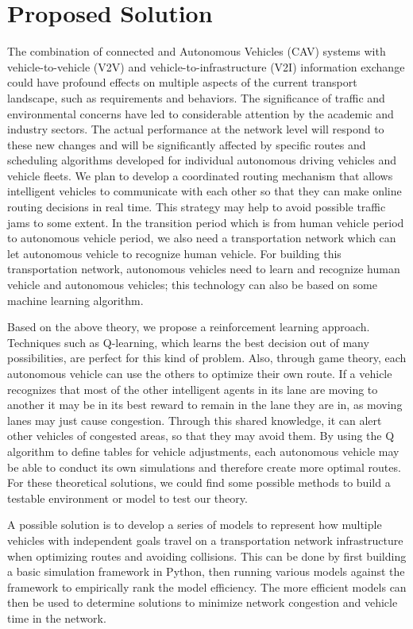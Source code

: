 \documentclass[onecolumn, draftclsnofoot,10pt, compsoc]{IEEEtran}
\begin{document}
\section{Proposed Solution}
The combination of connected and Autonomous Vehicles (CAV) systems with vehicle-to-vehicle (V2V) and vehicle-to-infrastructure (V2I) information exchange could have profound effects on multiple aspects of the current transport landscape, such as requirements and behaviors.
The significance of traffic and environmental concerns have led to considerable attention by the academic and industry sectors.
The actual performance at the network level will respond to these new changes and will be significantly affected by specific routes and scheduling algorithms developed for individual autonomous driving vehicles and vehicle fleets.
We plan to develop a coordinated routing mechanism that allows intelligent vehicles to communicate with each other so that they can make online routing decisions in real time.
This strategy may help to avoid possible traffic jams to some extent.
In the transition period which is from human vehicle period to autonomous vehicle period, we also need a transportation network which can let autonomous vehicle to recognize human vehicle.
For building this transportation network, autonomous vehicles need to learn and recognize human vehicle and autonomous vehicles; this technology can also be based on some machine learning algorithm.

Based on the above theory, we propose a reinforcement learning approach.
Techniques such as Q-learning, which learns the best decision out of many possibilities, are perfect for this kind of problem.
Also, through game theory, each autonomous vehicle can use the others to optimize their own route.
If a vehicle recognizes that most of the other intelligent agents in its lane are moving to another it may be in its best reward to remain in the lane they are in, as moving lanes may just cause congestion.
Through this shared knowledge, it can alert other vehicles of congested areas, so that they may avoid them.
By using the Q algorithm to define tables for vehicle adjustments, each autonomous vehicle may be able to conduct its own simulations and therefore create more optimal routes.
For these theoretical solutions, we could find some possible methods to build a testable environment or model to test our theory.

A possible solution is to develop a series of models to represent how multiple vehicles with independent goals travel on a transportation network infrastructure when optimizing routes and avoiding collisions.
This can be done by first building a basic simulation framework in Python, then running various models against the framework to empirically rank the model efficiency.
The more efficient models can then be used to determine solutions to minimize network congestion and vehicle time in the network.
\end{document}
